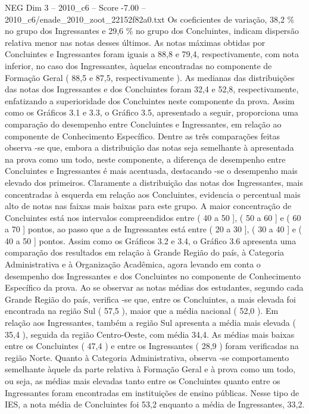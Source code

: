 \begin{textsample}{NEG Dim 3 – 2010\_c6 – Score -7.00 – 2010\_c6/enade\_2010\_zoot\_22152f82a0.txt}
Os coeficientes de variação, 38,2 \% no grupo dos Ingressantes e 29,6 \% no grupo dos Concluintes, indicam dispersão relativa menor nas notas desses últimos.
As notas máximas obtidas por Concluintes e Ingressantes foram iguais a 88,8 e 79,4, respectivamente, com nota inferior, no caso dos Ingressantes, àquelas encontradas no componente de Formação Geral ( 88,5 e 87,5, respectivamente ).
As medianas das distribuições das notas dos Ingressantes e dos Concluintes foram 32,4 e 52,8, respectivamente, enfatizando a superioridade dos Concluintes neste componente da prova.
Assim como os Gráficos 3.1 e 3.3, o Gráfico 3.5, apresentado a seguir, proporciona uma comparação do desempenho entre Concluintes e Ingressantes, em relação ao componente de Conhecimento Específico.
Dentre as três comparações feitas observa -se que, embora a distribuição das notas seja semelhante à apresentada na prova como um todo, neste componente, a diferença de desempenho entre Concluintes e Ingressantes é mais acentuada, destacando -se o desempenho mais elevado dos primeiros.
Claramente a distribuição das notas dos Ingressantes, mais concentradas à esquerda em relação aos Concluintes, evidencia o percentual mais alto de notas nas faixas mais baixas para este grupo.
A maior concentração de Concluintes está nos intervalos compreendidos entre ( 40 a 50 ], ( 50 a 60 ] e ( 60 a 70 ] pontos, ao passo que a de Ingressantes está entre ( 20 a 30 ], ( 30 a 40 ] e ( 40 a 50 ] pontos.
Assim como os Gráficos 3.2 e 3.4, o Gráfico 3.6 apresenta uma comparação dos resultados em relação à Grande Região do país, à Categoria Administrativa e à Organização Acadêmica, agora levando em conta o desempenho dos Ingressantes e dos Concluintes no componente de Conhecimento Específico da prova.
Ao se observar as notas médias dos estudantes, segundo cada Grande Região do país, verifica -se que, entre os Concluintes, a mais elevada foi encontrada na região Sul ( 57,5 ), maior que a média nacional ( 52,0 ).
Em relação aos Ingressantes, também a região Sul apresenta a média mais elevada ( 35,4 ), seguida da região Centro-Oeste, com média 34,4.
As médias mais baixas entre os Concluintes ( 47,4 ) e entre os Ingressantes ( 28,9 ) foram verificadas na região Norte.
Quanto à Categoria Administrativa, observa -se comportamento semelhante àquele da parte relativa à Formação Geral e à prova como um todo, ou seja, as médias mais elevadas tanto entre os Concluintes quanto entre os Ingressantes foram encontradas em instituições de ensino públicas.
Nesse tipo de IES, a nota média de Concluintes foi 53,2 enquanto a média de Ingressantes, 33,2.

\end{textsample}

